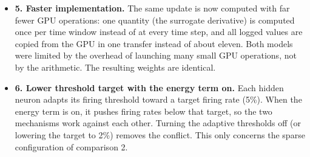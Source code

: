 {\begin{itemize}
  \item \textbf{5. Faster implementation.} The same update is now computed with far fewer GPU operations: one quantity (the surrogate derivative) is computed once per time window instead of at every time step, and all logged values are copied from the GPU in one transfer instead of about eleven. Both models were limited by the overhead of launching many small GPU operations, not by the arithmetic. The resulting weights are identical.
  \item \textbf{6. Lower threshold target with the energy term on.} Each hidden neuron adapts its firing threshold toward a target firing rate (5\%). When the energy term is on, it pushes firing rates below that target, so the two mechanisms work against each other. Turning the adaptive thresholds off (or lowering the target to 2\%) removes the conflict. This only concerns the sparse configuration of comparison 2.
\end{itemize}
}
